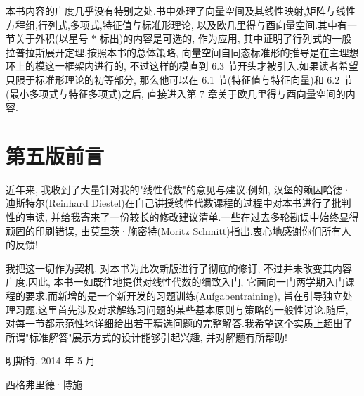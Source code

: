 本书内容的广度几乎没有特别之处.书中处理了向量空间及其线性映射,矩阵与线性方程组,行列式,多项式,特征值与标准形理论, 以及欧几里得与酉向量空间.其中有一节关于外积(以星号 $*$ 标出)的内容是可选的, 作为应用, 其中证明了行列式的一般拉普拉斯展开定理.按照本书的总体策略, 向量空间自同态标准形的推导是在主理想环上的模这一框架内进行的, 不过这样的模直到 6.3 节开头才被引入.如果读者希望只限于标准形理论的初等部分, 那么他可以在 6.1 节(特征值与特征向量)和 6.2 节(最小多项式与特征多项式)之后, 直接进入第 7 章关于欧几里得与酉向量空间的内容.

\clearpage

\chapter*{第五版前言}

近年来, 我收到了大量针对我的"线性代数"的意见与建议.例如, 汉堡的赖因哈德·迪斯特尔(Reinhard Diestel)在自己讲授线性代数课程的过程中对本书进行了批判性的审读, 并给我寄来了一份较长的修改建议清单.一些在过去多轮勘误中始终显得顽固的印刷错误, 由莫里茨·施密特(Moritz Schmitt)指出.衷心地感谢你们所有人的反馈!

我把这一切作为契机, 对本书为此次新版进行了彻底的修订, 不过并未改变其内容广度.因此, 本书一如既往地提供对线性代数的细致入门, 它面向一门两学期入门课程的要求.而新增的是一个新开发的习题训练(Aufgabentraining), 旨在引导独立处理习题.这里首先涉及对求解练习问题的某些基本原则与策略的一般性讨论.随后, 对每一节都示范性地详细给出若干精选问题的完整解答.我希望这个实质上超出了所谓"标准解答"展示方式的设计能够引起兴趣, 并对解题有所帮助!

明斯特, 2014 年 5 月

西格弗里德·博施

\clearpage
